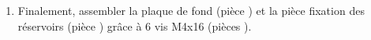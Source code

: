 \begin{enumerate}
\item Finalement, assembler la plaque de fond (pièce ) et la pièce fixation des réservoirs (pièce ) grâce à 6 vis M4x16 (pièces ).

\end{enumerate}